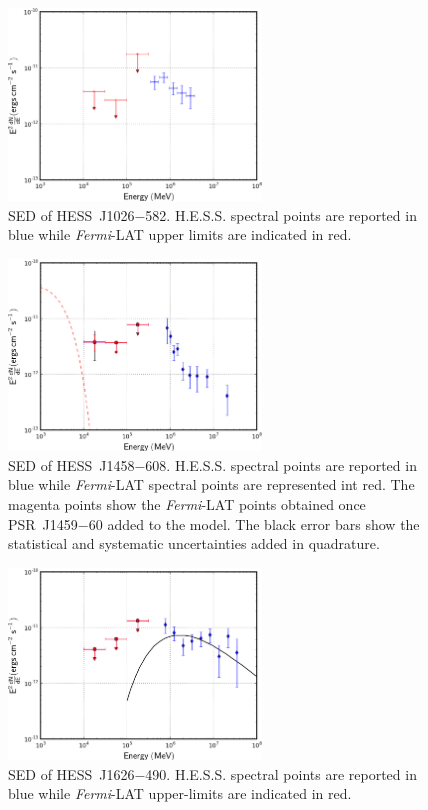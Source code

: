 \begin{figure}[h!]
\centering
\includegraphics[width=0.60\textwidth]{figures/HESSJ1026.eps}
\caption{SED of HESS~J1026$-$582. H.E.S.S. spectral points are reported in blue while \emph{Fermi}-LAT upper limits are indicated in red. 
\label{fig:1026}}
\end{figure}

\begin{figure}[h!]
\centering
\includegraphics[width=0.60\textwidth]{figures/HESSJ1458.eps}
\caption{SED of HESS~J1458$-$608. H.E.S.S. spectral points are reported in blue while \emph{Fermi}-LAT spectral points are represented int red. The magenta points show the \emph{Fermi}-LAT points obtained once PSR~J1459$-$60 added to the model. The black error bars show the statistical and systematic uncertainties added in quadrature.
\label{fig:1458}}
\end{figure}

\begin{figure}[h!]
\centering
\includegraphics[width=0.60\textwidth]{figures/HESSJ1626.eps}
\caption{SED of HESS~J1626$-$490. H.E.S.S. spectral points are reported in blue while \emph{Fermi}-LAT upper-limits are indicated in red.
\label{fig:1626}}
\end{figure}

